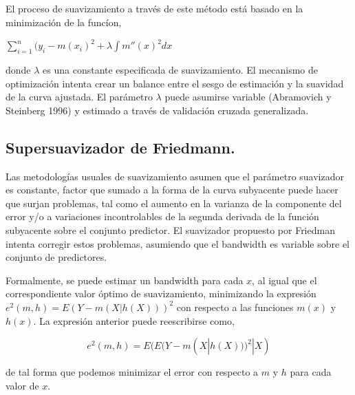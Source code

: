 \hspace*{0.4 cm}El proceso de suavizamiento a trav\'es de este m\'etodo est\'a basado en la minimizaci\'on de la func\'ion,

\begin{center}
$\displaystyle{ \sum_{i=1}^{n} (y_{i}-m(x_{i})^2 + \lambda \int m''(x)^2dx  }$
\end{center}

\vspace*{0.2 cm}

\noindent donde $\lambda$ es una constante especificada de suavizamiento. El mecanismo de optimizaci\'on intenta crear un balance entre el sesgo de estimaci\'on y la suavidad de la curva ajustada. El par\'ametro $\lambda$ puede asumirse variable (Abramovich y Steinberg 1996) y estimado a trav\'es de validaci\'on cruzada generalizada.

\subsection{Supersuavizador de Friedmann.\\}


\hspace*{0.4 cm} Las metodolog\'ias usuales de suavizamiento asumen que el par\'ametro suavizador es constante, factor que sumado a la forma de la curva subyacente puede hacer que surjan problemas, tal como el aumento en la varianza de la componente del error y/o a variaciones incontrolables de la segunda derivada de la funci\'on subyacente sobre el conjunto predictor. El suavizador propuesto por Friedman \cite{F} intenta corregir estos problemas, asumiendo que el bandwidth es variable sobre el conjunto de predictores.


\hspace*{0.4 cm} Formalmente, se puede estimar un bandwidth para cada $x$, al igual que el correspondiente valor \'optimo de suavizamiento, minimizando la expresi\'on $e^{2}(m,h) = E(Y - m(X|h(X)))^2$ con respecto a las funciones $m(x)$ y $h(x)$. La expresi\'on anterior puede reescribirse como,

\vspace*{0.2 cm}

\begin{equation}
e^{2}(m,h) = E(E(Y - m(X|h(X)))^2|X)
\label{friedman}
\end{equation}

\vspace*{0.2 cm}

\noindent de tal forma que podemos minimizar el error con respecto a $m$ y $h$ para cada valor de $x$.

